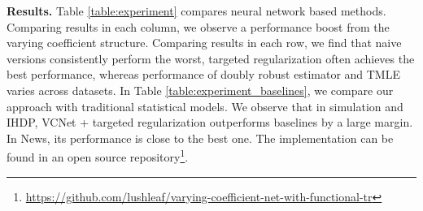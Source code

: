 
\textbf{Results.}
Table \ref{table:experiment} compares neural network based methods. Comparing results in each column, we observe a performance boost from the varying coefficient structure. Comparing results in each row, we find that naive versions consistently perform the worst, targeted regularization often achieves the best performance, whereas performance of doubly robust estimator and TMLE varies across datasets.
In Table \ref{table:experiment_baselines}, we compare our approach with traditional statistical models. We observe that in simulation and IHDP, VCNet + targeted regularization outperforms baselines by a large margin. In News, its performance is close to the best one. %
The implementation can be found in an open source repository\footnote{\url{https://github.com/lushleaf/varying-coefficient-net-with-functional-tr}}.


